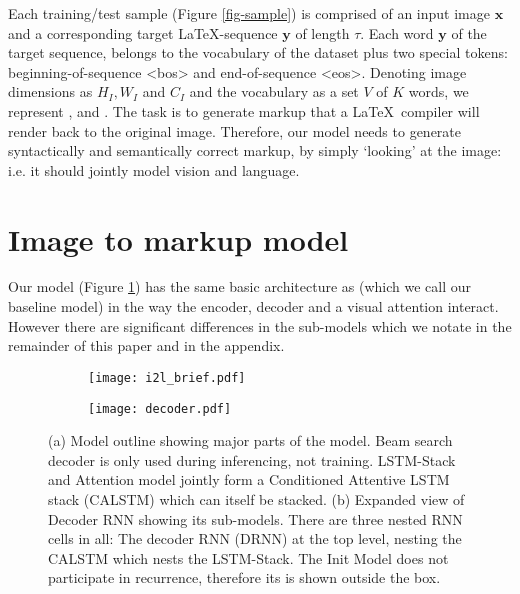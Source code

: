 \documentclass{article}
\newcommand{\suppmat}{appendix}
\begin{document}
Each training/test sample (Figure \ref{fig-sample}) is comprised of an input image  $\boldsymbol{x}$ and a corresponding target \LaTeX -sequence $\boldsymbol{y}$ of length $\tau$. Each word $\boldsymbol{y}$ of the target sequence, belongs to the vocabulary of the dataset plus two special tokens: beginning-of-sequence <bos> and end-of-sequence <eos>. Denoting image dimensions as $H_I, W_I$ and $C_I$ and the vocabulary as a set $V$ of $K$ words, we represent ,  and .
The task is to generate markup that a \LaTeX ~compiler will render back to the original image. Therefore, our model needs to generate syntactically and semantically correct markup, by simply `looking' at the image: i.e. it should jointly model vision and language.

\section{Image to markup model}
Our model (Figure \ref{fig-i2l-brief}) has the same basic architecture as \cite{Xu2015ShowAA} (which we call our baseline model) in the way the encoder, decoder and a visual attention interact. However there are significant differences in the sub-models which we notate in the remainder of this paper and in the \suppmat.
\begin{figure}[!h]
	\begin{subfigure}{0.5\textwidth}
		\texttt{[image: i2l\_brief.pdf]}
		\centering
		\caption{}
		\label{fig-i2l-brief}
	\end{subfigure}
\begin{subfigure}{0.5\textwidth}
		\texttt{[image: decoder.pdf]}
		\centering
		\caption{}
		\label{fig-decoder}
	\end{subfigure}
	\caption[Model]{(a) Model outline showing major parts of the model. Beam search decoder is only used during inferencing, not training. LSTM-Stack and Attention model jointly form a Conditioned Attentive LSTM stack (CALSTM) which can itself be stacked. (b) Expanded view of Decoder RNN showing its sub-models. There are three nested RNN cells in all: The decoder RNN (DRNN) at the top level, nesting the CALSTM which nests the LSTM-Stack. The Init Model does not participate in recurrence, therefore its is shown outside the box.}
\end{figure}
\end{document}
